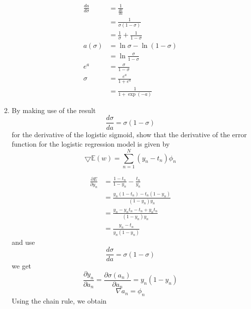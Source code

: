 \documentclass[a4paper]{article}
\begin{document}
\begin{enumerate}
\begin{solution}
\begin{equation*}
			\begin{aligned}
				\frac{da}{d\sigma}&=\frac{1}{\frac{d\sigma}{da}}\\
				&=\frac{1}{\sigma(1-\sigma)}\\
				&=\frac{1}{\sigma}+\frac{1}{1-\sigma}\\
				a(\sigma)&=\ln \sigma - \ln (1-\sigma)\\
				&=\ln \frac{\sigma}{1-\sigma}\\
				e^a&=\frac{\sigma}{1-\sigma}\\
				\sigma&=\frac{e^a}{1+e^a}\\
				&=\frac{1}{1+\exp (-a)}
			\end{aligned}
			\end{equation*}
		\end{solution}
		\item
		By making use of the result
		\begin{equation*}
			\frac{d\sigma}{da}=\sigma(1-\sigma)
		\end{equation*}
		for the derivative of the logistic sigmoid, show that the derivative of the error function for the logistic regression model is given by
		\begin{equation*}
			\bigtriangledown \mathbb{E}(w)=\sum_{n=1}^{N}(y_n-t_n)\phi_n
		\end{equation*}
		\begin{solution}
			\begin{equation*}
				\begin{aligned}
				\frac{\partial E}{\partial y_n} &= \frac{1-t_n}{1-y_n} - \frac{t_n}{y_n}\\
				&=\frac{y_n(1-t_n) - t_n (1-y_n)}{(1-y_n)y_n}\\
				&=\frac{y_n - y_nt_n - t_n + y_nt_n}{(1-y_n)y_n}\\
				&=\frac{y_n - t_n}{y_n(1-y_n)}
				\end{aligned}
			\end{equation*}
			and use
			\begin{equation*}
			\frac{d\sigma}{da}=\sigma(1-\sigma)
			\end{equation*}
			we get
			\begin{equation*}
				\frac{\partial y_n}{\partial a_n} = \frac{\partial \sigma(a_n)}{\partial a_n} = y_n(1-y_n)				
			\end{equation*}
			\begin{equation*}
				\nabla a_n = \phi_n
			\end{equation*}
			Using the chain rule, we obtain
			\begin{equation*}

\end{equation*}
\end{solution}
\end{enumerate}
\end{document}
